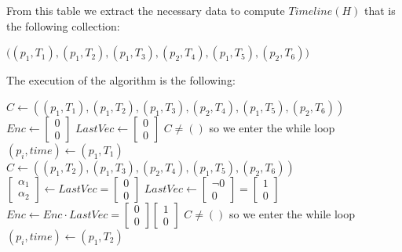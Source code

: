\begin{example}
\vspace{1em}

From this table we extract the necessary data to compute $Timeline(H)$ that is the following collection:

\begin{center}
$
\Big((p_1,T_1),(p_1,T_2),(p_1,T_3),(p_2,T_4),(p_1,T_5),(p_2,T_6)
\Big)
$
\end{center}

The execution of the algorithm is the following:

\begin{algorithmic}
\State $C \gets ((p_1,T_1),(p_1,T_2),(p_1,T_3),(p_2,T_4),(p_1,T_5),(p_2,T_6))$
\State $Enc \gets \begin{bmatrix} 0 \\ 0 \end{bmatrix}$
\State $LastVec\gets \begin{bmatrix} 0 \\ 0 \end{bmatrix}$
\State  $C \neq ()$ so we enter the while loop
	\State \hspace{2em} $(p_i,time)\gets (p_1,T_1)$
	\State \hspace{2em} $C\gets ((p_1,T_2),(p_1,T_3),(p_2,T_4),(p_1,T_5),(p_2,T_6))$
	\State \hspace{2em} $\begin{bmatrix}\alpha_1 \\ \alpha_2 \end{bmatrix} \gets LastVec=\begin{bmatrix} 0 \\ 0 \end{bmatrix}$
	\State \hspace{2em} $LastVec\gets \begin{bmatrix} \neg 0 \\ 0 \end{bmatrix}=\begin{bmatrix}1 \\ 0 \end{bmatrix}$ 
	\State \hspace{2em} $Enc\gets Enc\cdot LastVec=\begin{bmatrix} 0 \\ 0 \end{bmatrix}\!\!\begin{bmatrix}1 \\ 0 \end{bmatrix}$
\State \hrulefill
\State  $C \neq ()$ so we enter the while loop
	\State \hspace{2em} $(p_i,time)\gets (p_1,T_2)$

\end{algorithmic}
\end{example}
